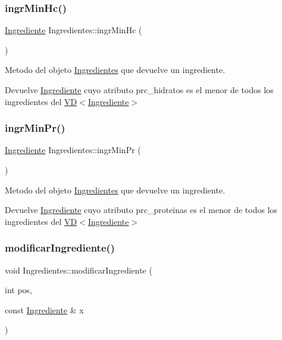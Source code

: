 \subsubsection{\texorpdfstring{ingr\+Min\+Hc()}{ingrMinHc()}}
{\footnotesize\ttfamily \hyperlink{classIngrediente}{Ingrediente} Ingredientes\+::ingr\+Min\+Hc (\begin{DoxyParamCaption}{ }\end{DoxyParamCaption})}



Metodo del objeto \hyperlink{classIngredientes}{Ingredientes} que devuelve un ingrediente. 

\begin{DoxyReturn}{Devuelve}
\hyperlink{classIngrediente}{Ingrediente} cuyo atributo prc\+\_\+hidratos es el menor de todos los ingredientes del \hyperlink{classVD}{V\+D$<$\+Ingrediente$>$} 
\end{DoxyReturn}
\mbox{\label{classIngredientes_a9a2a79d11677030108f3f4147ed748df}} 
\subsubsection{\texorpdfstring{ingr\+Min\+Pr()}{ingrMinPr()}}
{\footnotesize\ttfamily \hyperlink{classIngrediente}{Ingrediente} Ingredientes\+::ingr\+Min\+Pr (\begin{DoxyParamCaption}{ }\end{DoxyParamCaption})}



Metodo del objeto \hyperlink{classIngredientes}{Ingredientes} que devuelve un ingrediente. 

\begin{DoxyReturn}{Devuelve}
\hyperlink{classIngrediente}{Ingrediente} cuyo atributo prc\+\_\+proteinas es el menor de todos los ingredientes del \hyperlink{classVD}{V\+D$<$\+Ingrediente$>$} 
\end{DoxyReturn}
\mbox{\label{classIngredientes_a21f6b5fff2fdb3c0eb89bde2d08d07a6}} 
\subsubsection{\texorpdfstring{modificar\+Ingrediente()}{modificarIngrediente()}}
{\footnotesize\ttfamily void Ingredientes\+::modificar\+Ingrediente (\begin{DoxyParamCaption}\item[{int}]{pos,  }\item[{const \hyperlink{classIngrediente}{Ingrediente} \&}]{x }\end{DoxyParamCaption})}



